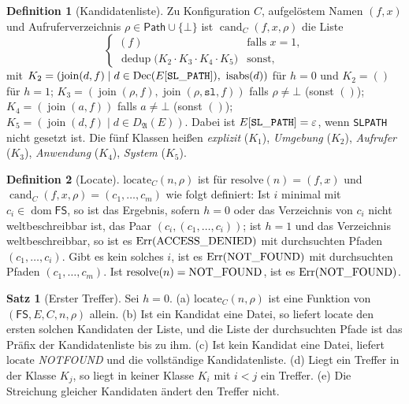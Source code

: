 \documentclass[a4paper,12pt,twoside]{report}
\DeclareRobustCommand{\_}{\ifmmode\mbox{\textunderscore}\else\textunderscore\allowbreak{}\fi}
\theoremstyle{definition}
\newtheorem{definition}{Definition}[chapter]
\newtheorem{satz}{Satz}[chapter]
\newcommand{\Path}{\mathsf{Path}}
\newcommand{\FS}{\mathsf{FS}}
\newcommand{\dom}{\operatorname{dom}}
\newcommand{\cand}{\operatorname{cand}}
\begin{document}
\begin{definition}[Kandidatenliste]
	\label{def:cand}
	Zu Konfiguration $C$, aufgelöstem Namen $(f,x)$ und Aufruferverzeichnis $\rho\in\Path\cup\{\bot\}$ ist $\cand_C(f,x,\rho)$ die Liste
	\[
	\begin{cases}
	(f) & \text{falls } x=1,\\
	\operatorname{dedup}\bigl(K_2\cdot K_3\cdot K_4\cdot K_5\bigr) & \text{sonst,}
	\end{cases}
	\]
	mit $K_2=(\operatorname{join}(d,f)\mid d\in\mathrm{Dec}(E[\mathtt{SL\_PATH}]),\ \operatorname{isabs}(d))$ für $h=0$ und $K_2=()$ für $h=1$; $K_3=(\operatorname{join}(\rho,f),\operatorname{join}(\rho,\texttt{sl},f))$ falls $\rho\ne\bot$ (sonst $()$); $K_4=(\operatorname{join}(a,f))$ falls $a\ne\bot$ (sonst $()$); $K_5=(\operatorname{join}(d,f)\mid d\in D_{\mathfrak A}(E))$. Dabei ist $E[\mathtt{SL\_PATH}]=\varepsilon$, wenn \texttt{SL\_PATH} nicht gesetzt ist. Die fünf Klassen heißen \emph{explizit} ($K_1$), \emph{Umgebung} ($K_2$), \emph{Aufrufer} ($K_3$), \emph{Anwendung} ($K_4$), \emph{System} ($K_5$).
\end{definition}

\begin{definition}[Locate]
	\label{def:locate}
	$\mathrm{locate}_C(n,\rho)$ ist für $\mathrm{resolve}(n)=(f,x)$ und $\cand_C(f,x,\rho)=(c_1,\ldots,c_m)$ wie folgt definiert: Ist $i$ minimal mit $c_i\in\dom\FS$, so ist das Ergebnis, sofern $h=0$ oder das Verzeichnis von $c_i$ nicht weltbeschreibbar ist, das Paar $(c_i,(c_1,\ldots,c_i))$; ist $h=1$ und das Verzeichnis weltbeschreibbar, so ist es $\mathrm{Err}(\mathrm{ACCESS\_DENIED})$ mit durchsuchten Pfaden $(c_1,\ldots,c_i)$. Gibt es kein solches $i$, ist es $\mathrm{Err}(\mathrm{NOT\_FOUND})$ mit durchsuchten Pfaden $(c_1,\ldots,c_m)$. Ist $\mathrm{resolve}(n)=\mathrm{NOT\_FOUND}$, ist es $\mathrm{Err}(\mathrm{NOT\_FOUND})$.
\end{definition}

\begin{satz}[Erster Treffer]
	\label{satz:erstertreffer}
	Sei $h=0$. (a) $\mathrm{locate}_C(n,\rho)$ ist eine Funktion von $(\FS,E,C,n,\rho)$ allein. (b) Ist ein Kandidat eine Datei, so liefert $\mathrm{locate}$ den ersten solchen Kandidaten der Liste, und die Liste der durchsuchten Pfade ist das Präfix der Kandidatenliste bis zu ihm. (c) Ist kein Kandidat eine Datei, liefert $\mathrm{locate}$ \emph{NOT\_FOUND} und die vollständige Kandidatenliste. (d) Liegt ein Treffer in der Klasse $K_j$, so liegt in keiner Klasse $K_i$ mit $i<j$ ein Treffer. (e) Die Streichung gleicher Kandidaten ändert den Treffer nicht.
\end{satz}
\end{document}
